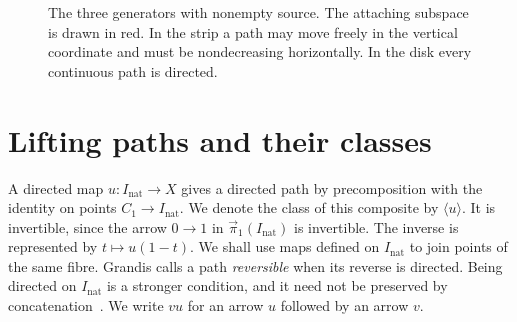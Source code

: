 \documentclass[12pt,a4paper]{amsart}
\theoremstyle{definition}
\renewcommand{\vec}{\overrightarrow}
\newcommand{\rev}[1]{#1_{\mathrm{nat}}}
\newcommand{\Iv}{\rev{I}}
\newcommand{\cube}[1]{C_{#1}}
\newcommand{\PiC}{\vec{\pi}_1}
\newcommand{\clp}[1]{\langle #1\rangle}
\begin{document}
\begin{figure}[htbp]
\centering
{}
\caption{The three generators with nonempty source. The attaching subspace is drawn in red. In the strip a path may move freely in the vertical coordinate and must be nondecreasing horizontally. In the disk every continuous path is directed.}\label{fig:generators}
\end{figure}

\section{Lifting paths and their classes}\label{sec:lifts}

A directed map $u\colon\Iv\to X$ gives a directed path by precomposition with the identity on points $\cube1\to\Iv$. We denote the class of this composite by $\clp u$. It is invertible, since the arrow $0\to1$ in $\PiC(\Iv)$ is invertible. The inverse is represented by $t\mapsto u(1-t)$. We shall use maps defined on $\Iv$ to join points of the same fibre. Grandis calls a path \emph{reversible} when its reverse is directed. Being directed on $\Iv$ is a stronger condition, and it need not be preserved by concatenation~\cite[Section~1.5]{mg}. We write $vu$ for an arrow $u$ followed by an arrow $v$.
\end{document}
